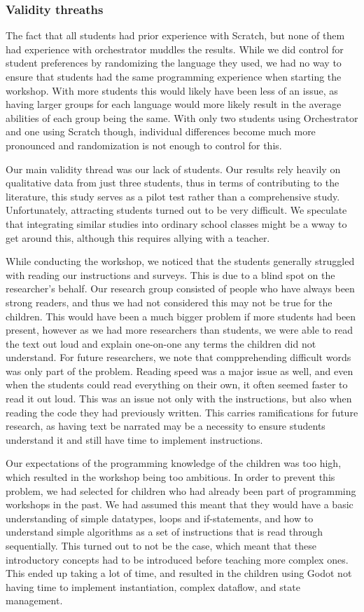 \subsubsection{Validity threaths}
The fact that all students had prior experience with Scratch, but none of them had experience with orchestrator muddles the results. While we did control for student preferences by randomizing the language they used, we had no way to ensure that students had the same programming experience when starting the workshop. With more students this would likely have been less of an issue, as having larger groups for each language would more likely result in the average abilities of each group being the same. With only two students using Orchestrator and one using Scratch though, individual differences become much more pronounced and randomization is not enough to control for this.

Our main validity thread was our lack of students. Our results rely heavily on qualitative data from just three students, thus in terms of contributing to the literature, this study serves as a pilot test rather than a comprehensive study. Unfortunately, attracting students turned out to be very difficult. We speculate that integrating similar studies into ordinary school classes might be a wway to get around this, although this requires allying with a teacher.

While conducting the workshop, we noticed that the students generally struggled with reading our instructions and surveys. This is due to a blind spot on the researcher's behalf. Our research group consisted of people who have always been strong readers, and thus we had not considered this may not be true for the children. This would have been a much bigger problem if more students had been present, however as we had more researchers than students, we were able to read the text out loud and explain one-on-one any terms the children did not understand. For future researchers, we note that compprehending difficult words was only part of the problem. Reading speed was a major issue as well, and even when the students could read everything on their own, it often seemed faster to read it out loud. This was an issue not only with the instructions, but also when reading the code they had previously written. This carries ramifications for future research, as having text be narrated may be a necessity to ensure students understand it and still have time to implement instructions.

Our expectations of the programming knowledge of the children was too high, which
resulted in the workshop being too ambitious. In order to prevent this problem, we had selected for children who had already been part of programming workshops in the past.
We had assumed this meant that they would have a basic
understanding of simple datatypes, loops and if-statements, and how
to understand simple algorithms as a set of instructions that is read
through sequentially.
This turned out to not be the case, which meant
that these introductory concepts had to be introduced before teaching
more complex ones.
This ended up taking a lot of time, and resulted
in the children using Godot not having time to implement
instantiation, complex dataflow, and state management.

